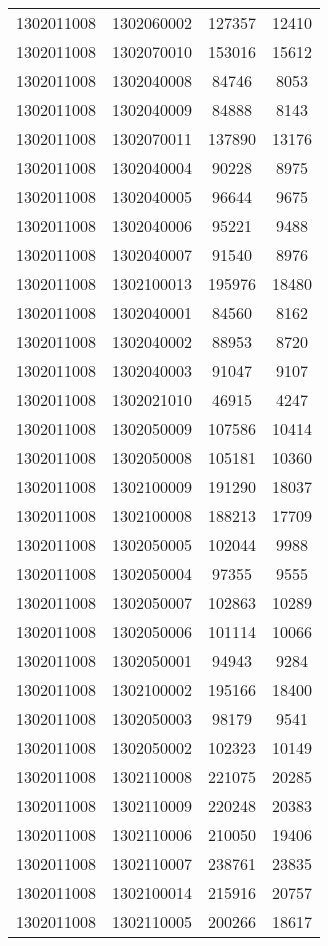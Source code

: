 \begin{longtable}{llcc}
1302011008 & 1302060002 & 127357 & 12410\\
1302011008 & 1302070010 & 153016 & 15612\\
1302011008 & 1302040008 & 84746 & 8053\\
1302011008 & 1302040009 & 84888 & 8143\\
1302011008 & 1302070011 & 137890 & 13176\\
1302011008 & 1302040004 & 90228 & 8975\\
1302011008 & 1302040005 & 96644 & 9675\\
1302011008 & 1302040006 & 95221 & 9488\\
1302011008 & 1302040007 & 91540 & 8976\\
1302011008 & 1302100013 & 195976 & 18480\\
1302011008 & 1302040001 & 84560 & 8162\\
1302011008 & 1302040002 & 88953 & 8720\\
1302011008 & 1302040003 & 91047 & 9107\\
1302011008 & 1302021010 & 46915 & 4247\\
1302011008 & 1302050009 & 107586 & 10414\\
1302011008 & 1302050008 & 105181 & 10360\\
1302011008 & 1302100009 & 191290 & 18037\\
1302011008 & 1302100008 & 188213 & 17709\\
1302011008 & 1302050005 & 102044 & 9988\\
1302011008 & 1302050004 & 97355 & 9555\\
1302011008 & 1302050007 & 102863 & 10289\\
1302011008 & 1302050006 & 101114 & 10066\\
1302011008 & 1302050001 & 94943 & 9284\\
1302011008 & 1302100002 & 195166 & 18400\\
1302011008 & 1302050003 & 98179 & 9541\\
1302011008 & 1302050002 & 102323 & 10149\\
1302011008 & 1302110008 & 221075 & 20285\\
1302011008 & 1302110009 & 220248 & 20383\\
1302011008 & 1302110006 & 210050 & 19406\\
1302011008 & 1302110007 & 238761 & 23835\\
1302011008 & 1302100014 & 215916 & 20757\\
1302011008 & 1302110005 & 200266 & 18617\\

\end{longtable}
